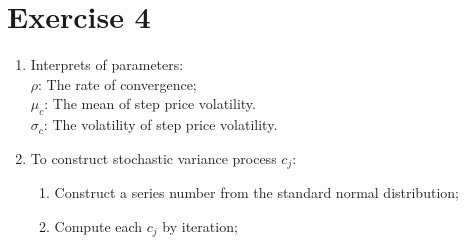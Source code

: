 \documentclass[12pt,letterpaper]{article}
\begin{document}
\section*{Exercise 4}
  \begin{enumerate}[label=\textbf{(\Alph*)}]
  \item Interprets of parameters:\\
 	      \emph{$\rho$}: The rate of convergence;\\
 	      \emph{$\mu_c$}: The mean of step price volatility.\\
 	      \emph{$\sigma_c$}: The volatility of step price volatility.
\item  To construct stochastic variance process $c_j$:
  \begin{enumerate}[label=(\roman*)]
  	\item Construct a series number from the standard normal distribution;
  	\item Compute each ${c_j}$ by iteration;
  \end{enumerate}
 

\end{enumerate}
\end{document}
